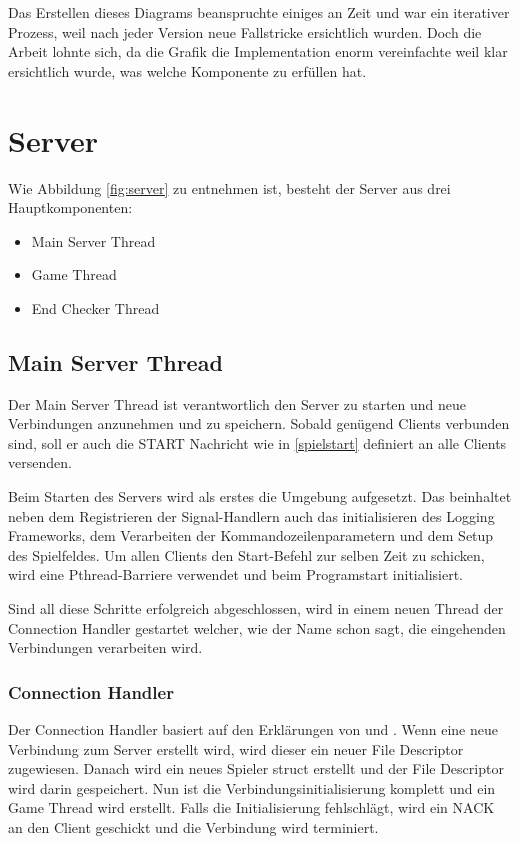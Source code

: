 Das Erstellen dieses Diagrams beanspruchte einiges an Zeit und war ein iterativer Prozess, weil nach jeder Version neue Fallstricke ersichtlich wurden. Doch die Arbeit lohnte sich, da die Grafik die Implementation enorm vereinfachte weil klar ersichtlich wurde, was welche Komponente zu erfüllen hat.

\section{Server}
Wie Abbildung \ref{fig:server} zu entnehmen ist, besteht der Server aus drei Hauptkomponenten:
\begin{itemize}
	\item Main Server Thread
	\item Game Thread
	\item End Checker Thread
\end{itemize}

\subsection{Main Server Thread}
Der Main Server Thread ist verantwortlich den Server zu starten und neue Verbindungen anzunehmen und zu speichern. Sobald genügend Clients verbunden sind, soll er auch die START Nachricht wie in \ref{spielstart} definiert an alle Clients versenden.

Beim Starten des Servers wird als erstes die Umgebung aufgesetzt. Das beinhaltet neben dem Registrieren der Signal-Handlern auch das initialisieren des Logging Frameworks, dem Verarbeiten der Kommandozeilenparametern und dem Setup des Spielfeldes. Um allen Clients den Start-Befehl zur selben Zeit zu schicken, wird eine Pthread-Barriere verwendet und beim Programstart initialisiert.

Sind all diese Schritte erfolgreich abgeschlossen, wird in einem neuen Thread der Connection Handler gestartet welcher, wie der Name schon sagt, die eingehenden Verbindungen verarbeiten wird.

\subsubsection{Connection Handler}
Der Connection Handler basiert auf den Erklärungen von \cite{byte-stream-server} und \cite{apue}. Wenn eine neue Verbindung zum Server erstellt wird, wird dieser ein neuer File Descriptor zugewiesen. 	Danach wird ein neues Spieler struct erstellt und der File Descriptor wird darin gespeichert. Nun ist die Verbindungsinitialisierung komplett und ein Game Thread wird erstellt. Falls die Initialisierung fehlschlägt, wird ein NACK an den Client geschickt und die Verbindung wird terminiert.

